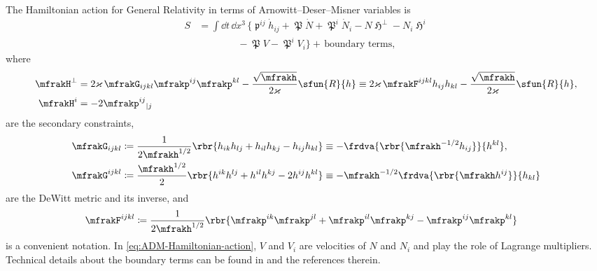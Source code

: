 \documentclass[a4paper,11pt]{article}
\begin{document}
The Hamiltonian action for General Relativity in terms 
of Arnowitt--Deser--Misner variables is \cite[ch.\ 4.2.2]{Kiefer2012}
\begin{align}
S &=
\int\dd t\,\dd x^3\,\Big\{
\mfrakp^{ij}\dot{h}_{ij} + \mfrakP\dot{N} + \mfrakP^i \dot{N}_i
-N\mfrakH^\perp - N_i\mfrakH^i
\nonumber \\
&\qquad\qquad
- \mfrakP V - \mfrakP^i V_i\Big\} +\,\text{boundary terms},
\label{eq:ADM-Hamiltonian-action}
\end{align}
where
\begin{align}
\mfrakH^\perp &=
2 \varkappa\,\mfrakG_{ijkl} \mfrakp^{ij}\mfrakp^{kl}
- \frac{\sqrt{\mfrakh}}{2\varkappa} \sfun{R}{h}
\equiv
2 \varkappa\,\mfrakF^{ijkl} h_{ij}h_{kl}
- \frac{\sqrt{\mfrakh}}{2\varkappa} \sfun{R}{h},
\\
\mfrakH^i &=
-2 \mfrakp^{ij}{}_{|j}
\end{align}
are the secondary constraints,
\begin{align}
\mfrakG_{ijkl} &\coloneqq \frac{1}{2\mfrakh^{1/2}}
\rbr{h_{ik}h_{lj}+h_{il}h_{kj}-h_{ij}h_{kl}}
\equiv -\frdva{\rbr{\mfrakh^{-1/2}h_{ij}}}{h^{kl}},\\
\mfrakG^{ijkl} &\coloneqq \frac{\mfrakh^{1/2}}{2}
\rbr{h^{ik}h^{lj}+h^{il}h^{kj}-2h^{ij}h^{kl}}
\equiv -\mfrakh^{-1/2}\frdva{\rbr{\mfrakh h^{ij}}}{h_{kl}}
\end{align}
are the DeWitt metric and its inverse, and
\begin{align}
\mfrakF^{ijkl} &\coloneqq \frac{1}{2\mfrakh^{1/2}}
\rbr{\mfrakp^{ik}\mfrakp^{jl}+\mfrakp^{il}\mfrakp^{kj}
-\mfrakp^{ij}\mfrakp^{kl}}
\end{align}
is a convenient notation. In \cref{eq:ADM-Hamiltonian-action}, $V$ and $V_i$ 
are velocities of $N$ and $N_i$ and play the role of Lagrange multipliers. 
Technical details about the boundary terms can be found in \cite[ch.\ 
4.2]{Poisson2004} and the references therein.
\end{document}
